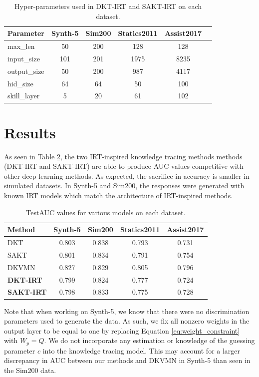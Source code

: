 \begin{table}
  \centering
  \begin{tabular}{l c c c c c}
    \hline
    Parameter & Synth-5 & Sim200 & Statics2011 & Assist2017 \\
    \hline
    max\_len & 50 & 200 & 128 & 128 \\
    input\_size & 101 & 201 & 1975 & 8235 \\
    output\_size & 50 & 200 & 987 & 4117 \\
    hid\_size & 64 & 64 & 50 & 100 \\
    skill\_layer & 5 & 20 & 61 & 102 
  \end{tabular}
  \caption{Hyper-parameters used in DKT-IRT and SAKT-IRT on each dataset.}
  \label{tab:kt_params}
\end{table}

\section{Results}

As seen in Table \ref{tab:kt_results}, the two IRT-inspired knowledge tracing methods methods (DKT-IRT and SAKT-IRT) are able to produce AUC values competitive with other deep learning methods. As expected, the sacrifice in accuracy is smaller in simulated datasets. In Synth-5 and Sim200, the responses were generated with known IRT models which match the architecture of IRT-inspired methods. 

\begin{table}
  \centering
  \begin{tabular}{l c c c c}
    \hline
    Method & Synth-5 & Sim200 & Statics2011 & Assist2017 \\
    \hline 
    DKT & 0.803 & 0.838 & 0.793 & 0.731 \\
    SAKT & 0.801 & 0.834 & 0.791  & 0.754 \\
    DKVMN & 0.827 & 0.829 & 0.805 & 0.796 \\
    \textbf{DKT-IRT} & 0.799 & 0.824 & 0.777 & 0.724 \\
    \textbf{SAKT-IRT} & 0.798 & 0.833 & 0.775 & 0.728
  \end{tabular}
  \caption{TestAUC values for various models on each dataset.}
  \label{tab:kt_results}
\end{table}

Note that when working on Synth-5, we know that there were no discrimination parameters used to generate the data. As such, we fix all nonzero weights in the output layer to be equal to one by replacing Equation \ref{eq:weight_constraint} with $W_p = Q$. We do not incorporate any estimation or knowledge of the guessing parameter $c$ into the knowledge tracing model. This may account for a larger discrepancy in AUC between our methods and DKVMN in Synth-5 than seen in the Sim200 data.

